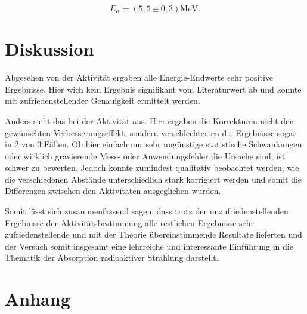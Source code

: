 \documentclass{article}
\begin{document}
\begin{equation}
    {E_\alpha = (5,5 \pm 0,3)} \text{MeV}.
\end{equation}



\newpage
\section{Diskussion}

Abgesehen von der Aktivität ergaben alle Energie-Endwerte sehr positive Ergebnisse. Hier wich kein Ergebnis signifikant vom Literaturwert ab und konnte mit zufriedenstellender Genauigkeit ermittelt werden. 

Anders sieht das bei der Aktivität aus. Hier ergaben die Korrekturen nicht den gewünschten Verbesserungseffekt, sondern verschlechterten die Ergebnisse sogar in 2 von 3 Fällen. Ob hier einfach nur sehr ungünstige statistische Schwankungen oder wirklich gravierende Mess- oder Anwendungsfehler die Ursache sind, ist schwer zu bewerten. Jedoch konnte zumindest qualitativ beobachtet werden, wie die verschiedenen Abstände unterschiedlich stark korrigiert werden und somit die Differenzen zwischen den Aktivitäten ausgeglichen wurden. 

Somit lässt sich zusammenfassend sagen, dass trotz der unzufriedenstellenden Ergebnisse der Aktivitätsbestimmung alle restlichen Ergebnisse sehr zufriedenstellende und mit der Theorie übereinstimmende Resultate lieferten und der Versuch somit insgesamt eine lehrreiche und interessante Einführung in die Thematik der Absorption radioaktiver Strahlung darstellt.  


\newpage

\section{Anhang}
\end{document}
